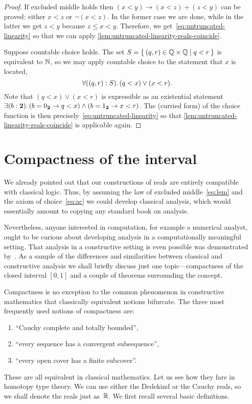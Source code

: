 \begin{proof}
  If excluded middle holds then $(x < y) \to (x < z) + (z < y)$ can be proved: either $x <
  z$ or $\lnot (x < z)$. In the former case we are done, while in the latter we get $z <
  y$ because $z \leq x < y$. Therefore, we get~\eqref{eq:untruncated-linearity} so that we
  can apply \autoref{lem:untruncated-linearity-reals-coincide}.

  Suppose countable choice holds. The set $S = \setof{ \pairr{q, r} \in \Q \times \Q | q <
    r }$ is equivalent to $\mathbb{N}$, so we may apply countable choice to the statement that $x$
  is located,
  \begin{equation*}
    \fall{\pairr{q, r} : S} (q < x) \lor (x < r).
  \end{equation*}
  Note that $(q < x) \lor (x < r)$ is expressible as an existential statement $\exis{b :
    \bool} (b = \bfalse \to q < x) \land (b = \btrue \to x < r)$. The (curried form) of
  the choice function is then precisely~\eqref{eq:untruncated-linearity} so that
  \autoref{lem:untruncated-linearity-reals-coincide} is applicable again.
\end{proof}

\section{Compactness of the interval}
\label{sec:compactness-interval}

We already pointed out that our constructions of reals are entirely compatible with
classical logic. Thus, by assuming the law of excluded middle~\eqref{eq:lem} and the axiom
of choice~\eqref{eq:ac} we could develop classical analysis, which would essentially
amount to copying any standard book on analysis.

Nevertheless, anyone interested in computation, for example a numerical analyst, ought to
be curious about developing analysis in a computationally meaningful setting. That
analysis in a constructive setting is even possible was demonstrated by~\cite{Bishop1967}.
As a sample of the differences and similarities between classical and constructive
analysis we shall briefly discuss just one topic---compactness of the closed interval
$[0,1]$ and a couple of theorems surrounding the concept.

Compactness is no exception to the common phenomenon in constructive mathematics that
classically equivalent notions bifurcate. The three most frequently used notions of
compactness are:
%
\begin{enumerate}
\item {} ``Cauchy complete and totally bounded'',
\item {} ``every sequence has a convergent subsequence'',
\item {} ``every open cover has a finite subcover''.
\end{enumerate}
%
These are all equivalent in classical mathematics.
Let us see how they fare in homotopy type theory. We can use either the Dedekind or the
Cauchy reals, so we shall denote the reals just as~$\mathbb{R}$. We first recall several basic
definitions.

